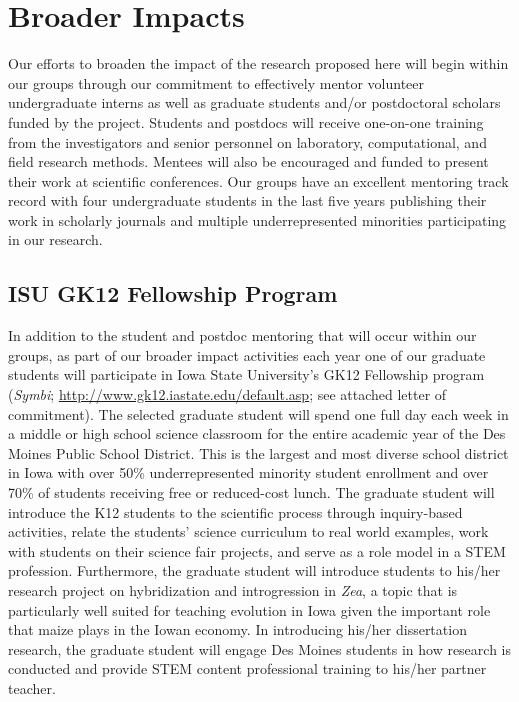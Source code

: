 \section*{Broader Impacts}

Our efforts to broaden the impact of the research proposed here will begin within our groups through our commitment to effectively mentor volunteer undergraduate interns as well as graduate students and/or postdoctoral scholars funded by the project. Students and postdocs will receive one-on-one training from the investigators and senior personnel on laboratory, computational, and field research methods.  Mentees will also be encouraged and funded to present their work at scientific conferences.  Our groups have an excellent mentoring track record with four undergraduate students in the last five years publishing their work in scholarly journals and multiple underrepresented minorities participating in our research.

\subsection*{ISU GK12 Fellowship Program}
	
In addition to the student and postdoc mentoring that will occur within our groups, as part of our broader impact activities each year one of our graduate students will participate in Iowa State University's GK12 Fellowship program (\emph{Symbi}; \url{http://www.gk12.iastate.edu/default.asp}; see attached letter of commitment). The selected graduate student will spend one full day each week in a middle or high school science classroom for the entire academic year of the Des Moines Public School District. This is the largest and most diverse school district in Iowa with over 50\% underrepresented minority student enrollment and over 70\% of students receiving free or reduced-cost lunch. The graduate student will introduce the K12 students to the scientific process through inquiry-based activities, relate the students’ science curriculum to real world examples, work with students on their science fair projects, and serve as a role model in a STEM profession. Furthermore, the graduate student will introduce students to his/her research project on hybridization and introgression in \emph{Zea}, a topic that is particularly well suited for teaching evolution in Iowa given the important role that maize plays in the Iowan economy. In introducing his/her dissertation research, the graduate student will engage Des Moines students in how research is conducted and provide STEM content professional training to his/her partner teacher.

